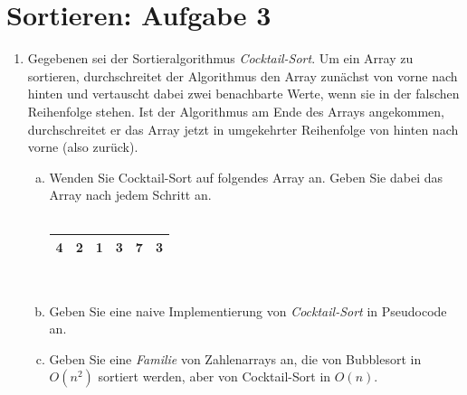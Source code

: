 \documentclass{scrartcl}
\begin{document}
\begin{enumerate}[(1)]
\end{enumerate}

\section*{Sortieren: Aufgabe 3}
\begin{enumerate}[(1)]

\item Gegebenen sei der Sortieralgorithmus \emph{Cocktail-Sort}. Um ein Array zu sortieren, durchschreitet der Algorithmus den Array zun\"achst von vorne nach hinten und vertauscht dabei zwei benachbarte Werte, wenn sie in der falschen Reihenfolge stehen. Ist der Algorithmus am Ende des Arrays angekommen, durchschreitet er das Array jetzt in umgekehrter Reihenfolge von hinten nach vorne (also \glqq zur\"uck\grqq).
\begin{enumerate}[(a)]
\item Wenden Sie Cocktail-Sort auf folgendes Array an. Geben Sie dabei das Array nach jedem Schritt an. \\
\\
\begin{center}
\begin{tabular}{|c|c|c|c|c|c|}
\hline
4 & 2 & 1 & 3 & 7 & 3 \\
\hline
\end{tabular}
\end{center}
\text{ } \\
\item Geben Sie eine naive Implementierung von \emph{Cocktail-Sort} in Pseudocode an.
\item Geben Sie eine \emph{Familie} von Zahlenarrays an, die von Bubblesort in $O(n^2)$ sortiert werden, aber von Cocktail-Sort in $O(n)$.
\end{enumerate}

\end{enumerate}
\end{document}
